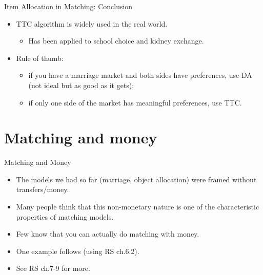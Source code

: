 \documentclass[english,10pt
,aspectratio=169
]{beamer}
\begin{document}
\begin{frame}{Item Allocation in Matching: Conclusion}
\begin{itemize}
	\item TTC algorithm is widely used in the real world.
	\begin{itemize}
		\item Has been applied to school choice and kidney exchange.
	\end{itemize}
	\item Rule of thumb:
	\begin{itemize}
		\item if you have a marriage market and both sides have preferences, use DA (not ideal but as good as it gets);
		\item if only one side of the market has meaningful preferences, use TTC.
	\end{itemize}
\end{itemize}
\end{frame}



\section{Matching and money}

\begin{frame}{Matching and Money}
\begin{itemize}
	\item The models we had so far (marriage, object allocation) were framed without transfers/money.
	\item Many people think that this non-monetary nature is one of the characteristic properties of matching models.
	\item Few know that you can actually do matching with money.
	\item One example follows (using RS ch.6.2).
	\item See RS ch.7-9 for more.
\end{itemize}
\end{frame}
\end{document}

